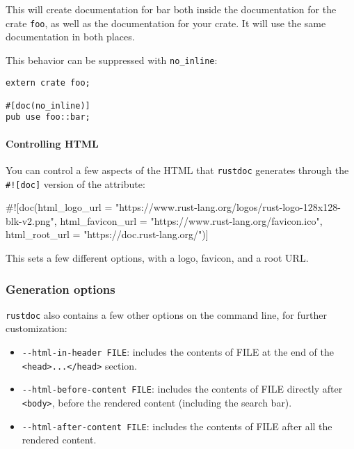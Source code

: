 \documentclass[a4paper,]{book}
\newenvironment{Shaded}{\begin{snugshade}}{\end{snugshade}}
\newcommand{\StringTok}[1]{\textcolor[rgb]{0.31,0.60,0.02}{{#1}}}
\newcommand{\AttributeTok}[1]{\textcolor[rgb]{0.77,0.63,0.00}{{#1}}}
\newcommand{\NormalTok}[1]{{#1}}
\providecommand{\tightlist}{%
  \setlength{\itemsep}{0pt}\setlength{\parskip}{0pt}}
\let\oldparagraph\paragraph
\renewcommand{\paragraph}[1]{\oldparagraph{#1}\mbox{}}
\begin{document}
This will create documentation for bar both inside the documentation for
the crate \texttt{foo}, as well as the documentation for your crate. It
will use the same documentation in both places.

This behavior can be suppressed with \texttt{no\_inline}:

\begin{verbatim}
extern crate foo;

#[doc(no_inline)]
pub use foo::bar;
\end{verbatim}

\paragraph{Controlling HTML}\label{controlling-html}

You can control a few aspects of the HTML that \texttt{rustdoc}
generates through the \texttt{\#!{[}doc{]}} version of the attribute:

\begin{Shaded}
\begin{Highlighting}[]
\AttributeTok{#![}\NormalTok{doc}\AttributeTok{(}\NormalTok{html_logo_url }\AttributeTok{=} \StringTok{"https://www.rust-lang.org/logos/rust-logo-128x128-blk-v2.png"}\AttributeTok{,}
       \NormalTok{html_favicon_url }\AttributeTok{=} \StringTok{"https://www.rust-lang.org/favicon.ico"}\AttributeTok{,}
       \NormalTok{html_root_url }\AttributeTok{=} \StringTok{"https://doc.rust-lang.org/"}\AttributeTok{)]}
\end{Highlighting}
\end{Shaded}

This sets a few different options, with a logo, favicon, and a root URL.

\subsubsection{Generation options}\label{generation-options}

\texttt{rustdoc} also contains a few other options on the command line,
for further customization:

\begin{itemize}
\tightlist
\item
  \texttt{-\/-html-in-header\ FILE}: includes the contents of FILE at
  the end of the
  \texttt{\textless{}head\textgreater{}...\textless{}/head\textgreater{}}
  section.
\item
  \texttt{-\/-html-before-content\ FILE}: includes the contents of FILE
  directly after \texttt{\textless{}body\textgreater{}}, before the
  rendered content (including the search bar).
\item
  \texttt{-\/-html-after-content\ FILE}: includes the contents of FILE
  after all the rendered content.
\end{itemize}
\end{document}

